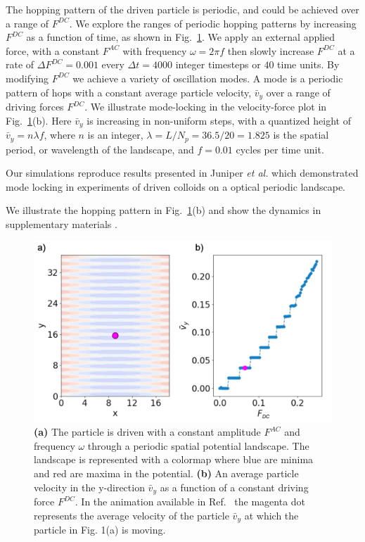 \documentclass[twocolumn,preprintnumbers,amsmath,amssymb,aps,prx]{revtex4}
\begin{document}
The hopping pattern of the driven particle is periodic,
and could be achieved over a range of $F^{DC}$.  %
We explore the ranges of periodic hopping patterns
by increasing $F^{DC}$ as a function of time,
as shown in 
%
Fig.~\ref{fig:1}.
We apply an external applied force, 
with 
a constant $F^{AC}$ with frequency $\omega = 2\pi f$
then slowly increase $F^{DC}$
at a rate of $\Delta F^{DC} = 0.001$ every $\Delta t = 4000$ integer timesteps
or $40$ time units.
By modifying $F^{DC}$ we 
achieve a variety of oscillation modes.
A mode is a periodic pattern of hops
with a constant average particle velocity, $\bar{v}_{y}$
over a range of driving forces $F^{DC}$.
We illustrate mode-locking in 
the velocity-force plot in Fig.~\ref{fig:1}(b).
Here $\bar{v}_{y}$ is increasing in non-uniform steps,
with a quantized height of
$\bar{v}_{y} = n \lambda f$,
where $n$ is an integer,
$\lambda = L/N_p = 36.5/20 = 1.825$ is the spatial period, or wavelength
of the landscape,
and $f = 0.01$ cycles per time unit.

Our simulations reproduce results presented in 
Juniper {\it et al.} \cite{Juniper2015, Juniper2018}
which demonstrated
mode locking in
experiments of 
driven colloids on a
optical periodic landscape.

We illustrate the hopping pattern in Fig.~\ref{fig:1}(b)
and 
show the dynamics 
in supplementary materials \cite{supp1}.

\begin{center}
\begin{figure}[h!]
\centering
\includegraphics[width=\columnwidth]{single}
\caption{\textbf{(a)} The particle is driven with a constant amplitude $F^{AC}$ and frequency $\omega$ through a periodic spatial potential landscape.  The landscape is represented with a colormap where blue are minima and red are maxima in the potential. \textbf{(b)} An average particle velocity in the y-direction $\bar{v}_{y}$ as a function of a constant driving force $F^{DC}$. In the animation available in Ref.~\cite{supp1} the magenta dot represents the average velocity of the particle $\bar{v}_{y}$ at which the particle in Fig. 1(a) is moving.}
\label{fig:1}
\end{figure}
\end{center}
\end{document}

